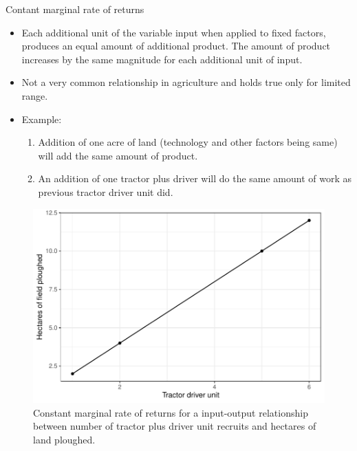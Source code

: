 \documentclass[12pt,ignorenonframetext,aspectratio=169]{beamer}
\providecommand{\tightlist}{%
  \setlength{\itemsep}{0pt}\setlength{\parskip}{0pt}}
\begin{document}
\begin{frame}{Contant marginal rate of returns}
\protect\hypertarget{contant-marginal-rate-of-returns}{}
\begin{itemize}
\tightlist
\item
  Each additional unit of the variable input when applied to fixed
  factors, produces an equal amount of additional product. The amount of
  product increases by the same magnitude for each additional unit of
  input.
\item
  Not a very common relationship in agriculture and holds true only for
  limited range.
\item
  Example:

  \begin{enumerate}
  \tightlist
  \item
    Addition of one acre of land (technology and other factors being
    same) will add the same amount of product.
  \item
    An addition of one tractor plus driver will do the same amount of
    work as previous tractor driver unit did.
  \end{enumerate}
\end{itemize}
\end{frame}

\begin{frame}{}
\protect\hypertarget{section-3}{}
\begin{figure}
\includegraphics[width=0.7\linewidth]{production_relationship_files/figure-beamer/tractor-driver-unit-cmr-fig-1} \caption{Constant marginal rate of returns for a input-output relationship between number of tractor plus driver unit recruits and hectares of land ploughed.}\label{fig:tractor-driver-unit-cmr-fig}
\end{figure}
\end{frame}
\end{document}
